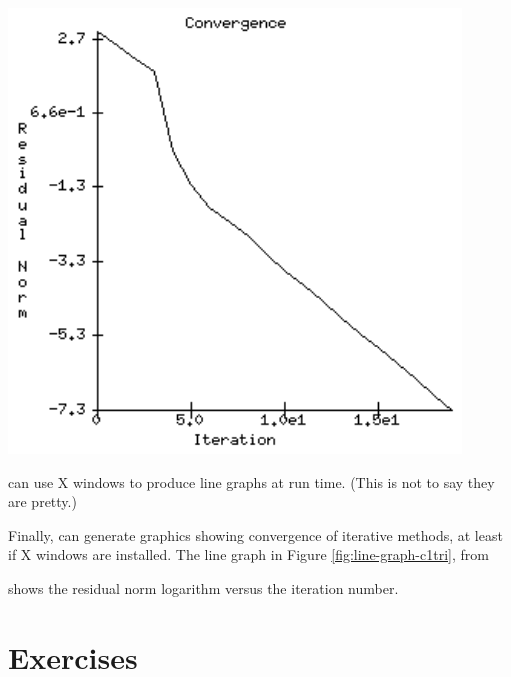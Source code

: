 \begin{marginfigure}
\bigskip
\includegraphics[width=0.9\textwidth]{line-graph-c1tri}
\caption{\PETSc can use X windows to produce line graphs at run time.  (This is not to say they are pretty.)}
\label{fig:line-graph-c1tri}
\end{marginfigure}

Finally, \PETSc can generate graphics showing convergence of iterative methods, at least if X windows are installed.  The line graph in Figure \ref{fig:line-graph-c1tri}, from
shows the residual norm logarithm versus the iteration number.

\bigskip
\section{Exercises}

